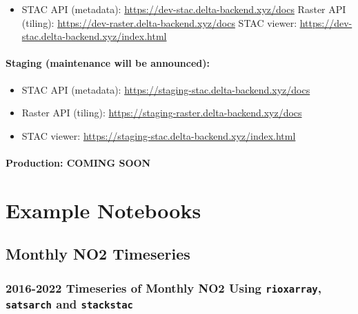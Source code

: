 \documentclass[
  letterpaper,
  DIV=11,
  numbers=noendperiod]{scrreprt}
\providecommand{\tightlist}{%
  \setlength{\itemsep}{0pt}\setlength{\parskip}{0pt}}
\begin{document}
\begin{itemize}
\tightlist
\item
  STAC API (metadata): \url{https://dev-stac.delta-backend.xyz/docs}
  Raster API (tiling): \url{https://dev-raster.delta-backend.xyz/docs}
  STAC viewer: \url{https://dev-stac.delta-backend.xyz/index.html}
\end{itemize}

\hypertarget{staging-maintenance-will-be-announced}{%
\subsection*{Staging (maintenance will be
announced):}\label{staging-maintenance-will-be-announced}}

\begin{itemize}
\tightlist
\item
  STAC API (metadata): \url{https://staging-stac.delta-backend.xyz/docs}
\item
  Raster API (tiling):
  \url{https://staging-raster.delta-backend.xyz/docs}
\item
  STAC viewer: \url{https://staging-stac.delta-backend.xyz/index.html}
\end{itemize}

\hypertarget{production-coming-soon}{%
\subsection*{Production: COMING SOON}\label{production-coming-soon}}

\part{Example Notebooks}

\hypertarget{monthly-no2-timeseries}{%
\chapter*{Monthly NO2 Timeseries}\label{monthly-no2-timeseries}}

\hypertarget{timeseries-of-monthly-no2-using-rioxarray-satsarch-and-stackstac}{%
\section*{\texorpdfstring{2016-2022 Timeseries of Monthly NO2 Using
\texttt{rioxarray}, \texttt{satsarch} and
\texttt{stackstac}}{2016-2022 Timeseries of Monthly NO2 Using rioxarray, satsarch and stackstac}}\label{timeseries-of-monthly-no2-using-rioxarray-satsarch-and-stackstac}}
\end{document}
